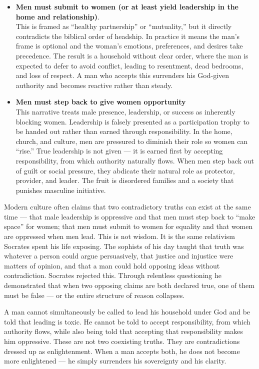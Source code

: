 \documentclass[12pt,a4paper]{book}
\begin{document}
\begin{itemize}
\item \textbf{Men must submit to women (or at least yield leadership in the home and relationship)}.\\
This is framed as “healthy partnership” or “mutuality,” but it directly contradicts the biblical order of headship. In practice it means the man’s frame is optional and the woman’s emotions, preferences, and desires take precedence. The result is a household without clear order, where the man is expected to defer to avoid conflict, leading to resentment, dead bedrooms, and loss of respect. A man who accepts this surrenders his God-given authority and becomes reactive rather than steady.

\item \textbf{Men must step back to give women opportunity}\\
This narrative treats male presence, leadership, or success as inherently blocking women. Leadership is falsely presented as a participation trophy to be handed out rather than earned through responsibility. In the home, church, and culture, men are pressured to diminish their role so women can “rise.” True leadership is not given — it is earned first by accepting responsibility, from which authority naturally flows. When men step back out of guilt or social pressure, they abdicate their natural role as protector, provider, and leader. The fruit is disordered families and a society that punishes masculine initiative.
\end{itemize}

Modern culture often claims that two contradictory truths can exist at the same time — that male leadership is oppressive and that men must step back to “make space” for women; that men must submit to women for equality and that women are oppressed when men lead. This is not wisdom. It is the same relativism Socrates spent his life exposing. The sophists of his day taught that truth was whatever a person could argue persuasively, that justice and injustice were matters of opinion, and that a man could hold opposing ideas without contradiction. Socrates rejected this. Through relentless questioning he demonstrated that when two opposing claims are both declared true, one of them must be false — or the entire structure of reason collapses.

A man cannot simultaneously be called to lead his household under God and be told that leading is toxic. He cannot be told to accept responsibility, from which authority flows, while also being told that accepting that responsibility makes him oppressive. These are not two coexisting truths. They are contradictions dressed up as enlightenment. When a man accepts both, he does not become more enlightened — he simply surrenders his sovereignty and his clarity.
\end{document}
